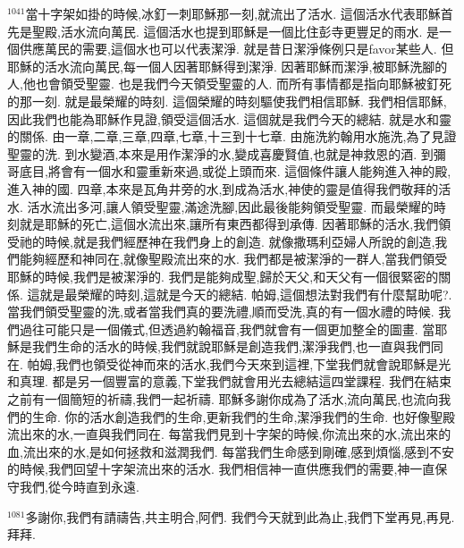 \documentclass{book}
\begin{document}
$^{1041}$當十字架如掛的時候,冰釘一刺耶穌那一刻,就流出了活水.
這個活水代表耶穌首先是聖殿,活水流向萬民.
這個活水也提到耶穌是一個比住彭寺更豐足的雨水.
是一個供應萬民的需要,這個水也可以代表潔淨.
就是昔日潔淨條例只是favor某些人.
但耶穌的活水流向萬民,每一個人因著耶穌得到潔淨.
因著耶穌而潔淨,被耶穌洗腳的人,他也會領受聖靈.
也是我們今天領受聖靈的人.
而所有事情都是指向耶穌被釘死的那一刻.
就是最榮耀的時刻.
這個榮耀的時刻驅使我們相信耶穌.
我們相信耶穌,因此我們也能為耶穌作見證,領受這個活水.
這個就是我們今天的總結.
就是水和靈的關係.
由一章,二章,三章,四章,七章,十三到十七章.
由施洗約翰用水施洗,為了見證聖靈的洗.
到水變酒,本來是用作潔淨的水,變成喜慶賢值,也就是神救恩的酒.
到彌哥底目,將會有一個水和靈重新來過,或從上頭而來.
這個條件讓人能夠進入神的殿,進入神的國.
四章,本來是瓦角井旁的水,到成為活水,神使的靈是值得我們敬拜的活水.
活水流出多河,讓人領受聖靈,滿途洗腳,因此最後能夠領受聖靈.
而最榮耀的時刻就是耶穌的死亡,這個水流出來,讓所有東西都得到承傳.
因著耶穌的活水,我們領受祂的時候,就是我們經歷神在我們身上的創造.
就像撒瑪利亞婦人所說的創造,我們能夠經歷和神同在,就像聖殿流出來的水.
我們都是被潔淨的一群人,當我們領受耶穌的時候,我們是被潔淨的.
我們是能夠成聖,歸於天父,和天父有一個很緊密的關係.
這就是最榮耀的時刻,這就是今天的總結.
帕姆,這個想法對我們有什麼幫助呢?.
當我們領受聖靈的洗,或者當我們真的要洗禮,順而受洗,真的有一個水禮的時候.
我們過往可能只是一個儀式,但透過約翰福音,我們就會有一個更加整全的圖畫.
當耶穌是我們生命的活水的時候,我們就說耶穌是創造我們,潔淨我們,也一直與我們同在.
帕姆,我們也領受從神而來的活水,我們今天來到這裡,下堂我們就會說耶穌是光和真理.
都是另一個豐富的意義,下堂我們就會用光去總結這四堂課程.
我們在結束之前有一個簡短的祈禱,我們一起祈禱.
耶穌多謝你成為了活水,流向萬民,也流向我們的生命.
你的活水創造我們的生命,更新我們的生命,潔淨我們的生命.
也好像聖殿流出來的水,一直與我們同在.
每當我們見到十字架的時候,你流出來的水,流出來的血,流出來的水,是如何拯救和滋潤我們.
每當我們生命感到剛確,感到煩惱,感到不安的時候,我們回望十字架流出來的活水.
我們相信神一直供應我們的需要,神一直保守我們,從今時直到永遠.

$^{1081}$多謝你,我們有請禱告,共主明合,阿們.
我們今天就到此為止,我們下堂再見,再見.
拜拜.
\newpage
\end{document}
